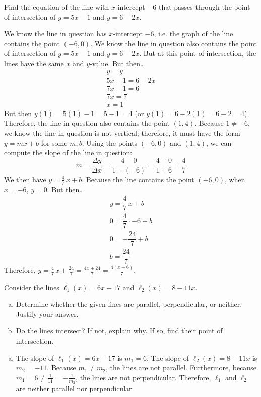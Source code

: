 \documentclass[12pt,letterpaper]{exam}
\begin{document}
\begin{questions}
\newpage
\question[10] Find the equation of the line with $x$-intercept $-6$ that passes through the point of intersection of $y= 5x - 1$ and $y= 6 - 2x$. \pspace

\sol We know the line in question has $x$-intercept $-6$, i.e. the graph of the line contains the point $(-6, 0)$. We know the line in question also contains the point of intersection of $y= 5x - 1$ and $y= 6 - 2x$. But at this point of intersection, the lines have the same $x$ and $y$-value. But then\dots
	\[
	\begin{gathered}
	y= y \\
	5x - 1= 6 - 2x \\
	7x - 1= 6 \\
	7x= 7 \\
	x= 1
	\end{gathered}
	\]
But then $y(1)= 5(1) - 1= 5 - 1= 4$ (or $y(1)= 6 - 2(1)= 6 - 2= 4$). Therefore, the line in question also contains the point $(1, 4)$. Because $1 \neq -6$, we know the line in question is not vertical; therefore, it must have the form $y= mx + b$ for some $m, b$. Using the points $(-6, 0)$ and $(1, 4)$, we can compute the slope of the line in question:
	\[
	m= \dfrac{\Delta y}{\Delta x}= \dfrac{4 - 0}{1 - (-6)}= \dfrac{4 - 0}{1 + 6}= \dfrac{4}{7}
	\]
We then have $y= \frac{4}{7}\,x + b$. Because the line contains the point $(-6, 0)$, when $x= -6$, $y= 0$. But then\dots
	\[
	\begin{gathered}
	y= \dfrac{4}{7}\,x + b \\[0.3cm]
	0= \dfrac{4}{7} \cdot -6 + b \\[0.3cm]
	0= -\dfrac{24}{7} + b \\[0.3cm]
	b= \dfrac{24}{7}
	\end{gathered}
	\] \pspace
Therefore, $y= \frac{4}{7}\,x + \frac{24}{7}= \frac{4x + 24}{7}= \frac{4(x + 6)}{7}$.



\newpage
\question[10] Consider the lines $\ell_1(x)= 6x - 17$ and $\ell_2(x)= 8 - 11x$. 
	\begin{enumerate}[(a)]
	\item Determine whether the given lines are parallel, perpendicular, or neither. Justify your answer.
	\item Do the lines intersect? If not, explain why. If so, find their point of intersection. 
	\end{enumerate} \pspace

\sol 
\begin{enumerate}[(a)]
\item The slope of $\ell_1(x)= 6x - 17$ is $m_1= 6$. The slope of $\ell_2(x)= 8 - 11x$ is $m_2= -11$. Because $m_1 \neq m_2$, the lines are not parallel. Furthermore, because $m_1= 6 \neq \frac{1}{11}= -\frac{1}{m_2}$, the lines are not perpendicular. Therefore, $\ell_1$ and $\ell_2$ are neither parallel nor perpendicular. \pspace


\end{enumerate}
\end{questions}
\end{document}
